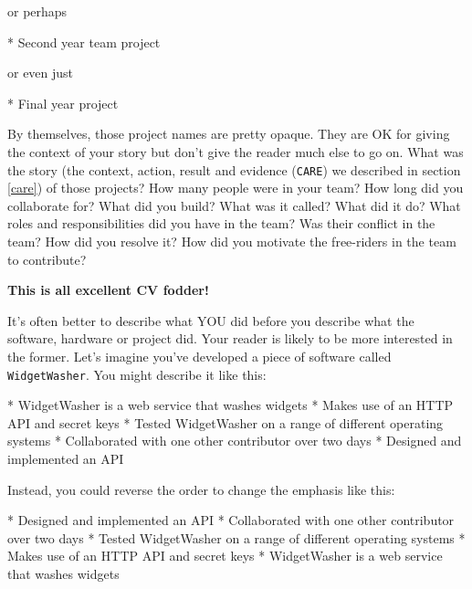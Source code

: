 \documentclass[
]{book}
\newenvironment{Shaded}{\begin{snugshade}}{\end{snugshade}}
\newcommand{\NormalTok}[1]{#1}
\newcommand{\SpecialStringTok}[1]{\textcolor[rgb]{0.31,0.60,0.02}{#1}}
\begin{document}
or perhaps

\begin{Shaded}
\begin{Highlighting}[]
\SpecialStringTok{* }\NormalTok{Second year team project}
\end{Highlighting}
\end{Shaded}

or even just

\begin{Shaded}
\begin{Highlighting}[]
\SpecialStringTok{* }\NormalTok{Final year project}
\end{Highlighting}
\end{Shaded}

By themselves, those project names are pretty opaque. They are OK for giving the context of your story but don't give the reader much else to go on. What was the story (the context, action, result and evidence (\texttt{CARE}) we described in section \ref{care}) of those projects? How many people were in your team? How long did you collaborate for? What did you build? What was it called? What did it do? What roles and responsibilities did you have in the team? Was their conflict in the team? How did you resolve it? How did you motivate the free-riders in the team to contribute?

\textbf{This is all excellent CV fodder!}

It's often better to describe what YOU did before you describe what the software, hardware or project did. Your reader is likely to be more interested in the former. Let's imagine you've developed a piece of software called \texttt{WidgetWasher}. You might describe it like this:

\begin{Shaded}
\begin{Highlighting}[]
\SpecialStringTok{* }\NormalTok{WidgetWasher is a web service that washes widgets}
\SpecialStringTok{* }\NormalTok{Makes use of an HTTP API and secret keys}
\SpecialStringTok{* }\NormalTok{Tested WidgetWasher on a range of different operating systems}
\SpecialStringTok{* }\NormalTok{Collaborated with one other contributor over two days}
\SpecialStringTok{* }\NormalTok{Designed and implemented an API}
\end{Highlighting}
\end{Shaded}

Instead, you could reverse the order to change the emphasis like this:

\begin{Shaded}
\begin{Highlighting}[]
\SpecialStringTok{* }\NormalTok{Designed and implemented an API}
\SpecialStringTok{* }\NormalTok{Collaborated with one other contributor over two days}
\SpecialStringTok{* }\NormalTok{Tested WidgetWasher on a range of different operating systems}
\SpecialStringTok{* }\NormalTok{Makes use of an HTTP API and secret keys}
\SpecialStringTok{* }\NormalTok{WidgetWasher is a web service that washes widgets}
\end{Highlighting}
\end{Shaded}
\end{document}
